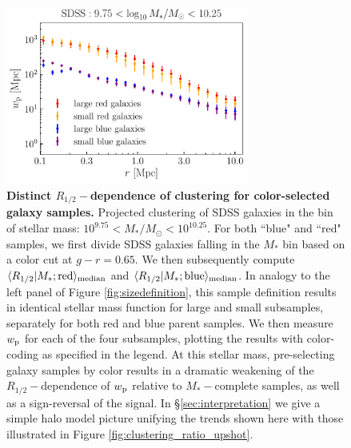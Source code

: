 \documentclass[usenatbib,usegraphicx,letterpaper]{mn2e}
\newcommand{\rhalf}{R_{1/2}}
\newcommand{\mstar}{M_{\ast}}
\newcommand{\wproj}{w_{\rm p}}
\newcommand{\median}[2]{\langle{#1}\vert{#2}\rangle_{\rm median}}
\newcommand{\msun}{M_\odot}
\begin{document}
\begin{figure}
\centering
\includegraphics[width=8cm]{FIGS/color_selected_size_dependent_clustering.pdf}
\caption{
{\bf Distinct $\rhalf-$dependence of clustering for color-selected galaxy samples.}
Projected clustering of SDSS galaxies in the bin of stellar mass: $10^{9.75}<\mstar/\msun<10^{10.25}.$ For both ``blue" and ``red" samples, we first divide SDSS galaxies falling in the $\mstar$ bin based on a color cut at $g-r=0.65.$ We then subsequently compute $\median{\rhalf}{\mstar; {\rm red}}$ and $\median{\rhalf}{\mstar; {\rm blue}}$. In analogy to the left panel of Figure \ref{fig:sizedefinition}, this sample definition results in identical stellar mass function for large and small subsamples, separately for both red and blue parent samples. We then measure $\wproj$ for each of the four subsamples, plotting the results with color-coding as specified in the legend. At this stellar mass, pre-selecting galaxy samples by color results in a dramatic weakening of the $\rhalf-$dependence of $\wproj$ relative to $\mstar-$complete samples, as well as a sign-reversal of the signal. In \S\ref{sec:interpretation} we give a simple halo model picture unifying the trends shown here with those illustrated in Figure \ref{fig:clustering_ratio_upshot}.
}
\label{fig:colorclustering}
\end{figure}
\end{document}

